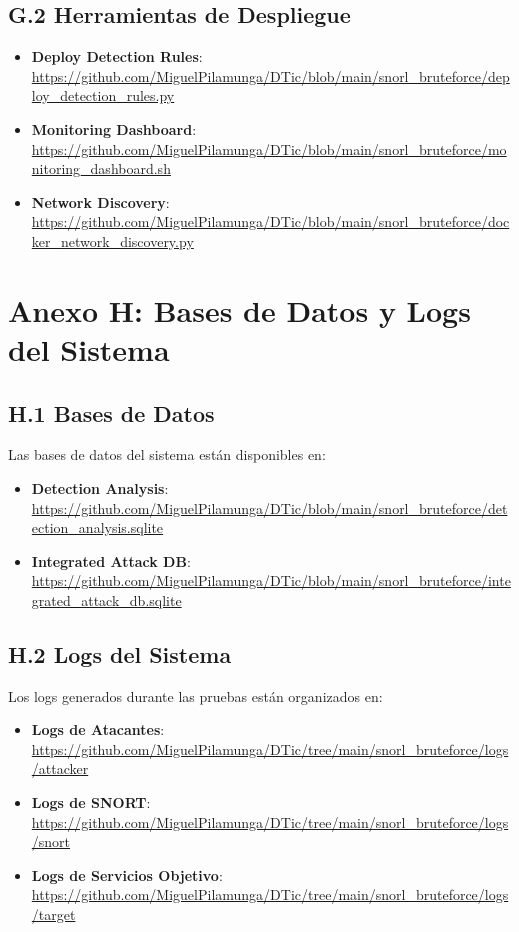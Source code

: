 \subsection*{G.2 Herramientas de Despliegue}
\begin{itemize}
    \item \textbf{Deploy Detection Rules}: \url{https://github.com/MiguelPilamunga/DTic/blob/main/snorl_bruteforce/deploy_detection_rules.py}
    \item \textbf{Monitoring Dashboard}: \url{https://github.com/MiguelPilamunga/DTic/blob/main/snorl_bruteforce/monitoring_dashboard.sh}
    \item \textbf{Network Discovery}: \url{https://github.com/MiguelPilamunga/DTic/blob/main/snorl_bruteforce/docker_network_discovery.py}
\end{itemize}

\section*{Anexo H: Bases de Datos y Logs del Sistema}

\subsection*{H.1 Bases de Datos}
Las bases de datos del sistema están disponibles en:
\begin{itemize}
    \item \textbf{Detection Analysis}: \url{https://github.com/MiguelPilamunga/DTic/blob/main/snorl_bruteforce/detection_analysis.sqlite}
    \item \textbf{Integrated Attack DB}: \url{https://github.com/MiguelPilamunga/DTic/blob/main/snorl_bruteforce/integrated_attack_db.sqlite}
\end{itemize}

\subsection*{H.2 Logs del Sistema}
Los logs generados durante las pruebas están organizados en:
\begin{itemize}
    \item \textbf{Logs de Atacantes}: \url{https://github.com/MiguelPilamunga/DTic/tree/main/snorl_bruteforce/logs/attacker}
    \item \textbf{Logs de SNORT}: \url{https://github.com/MiguelPilamunga/DTic/tree/main/snorl_bruteforce/logs/snort}
    \item \textbf{Logs de Servicios Objetivo}: \url{https://github.com/MiguelPilamunga/DTic/tree/main/snorl_bruteforce/logs/target}
\end{itemize}


